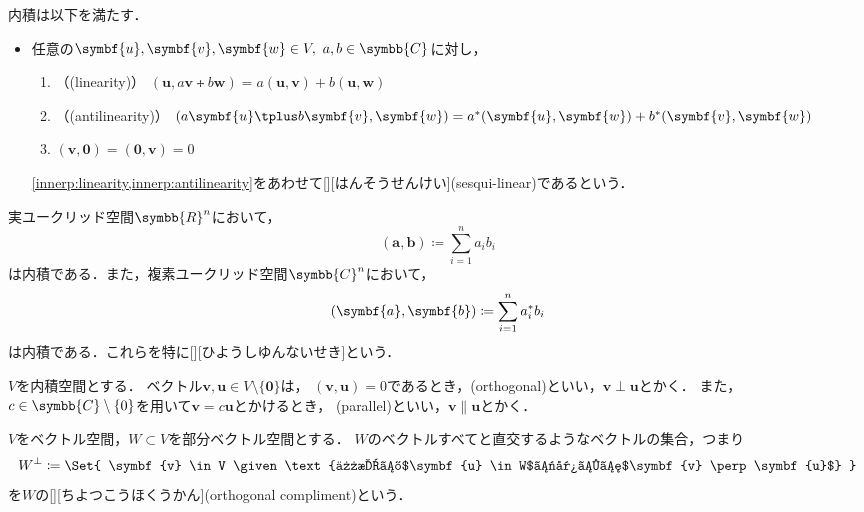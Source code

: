 \documentclass[../sotsu.tex]{subfiles}
\begin{document}
\begin{corollary}
    内積は以下を満たす．
    \begin{itemize}
        \item 任意の$\symbf{u}, \symbf{v}, \symbf{w} \in V, \  a, b \in \symbb{C}$に対し，
        \begin{enumerate}
            \item \label{innerp:linearity} （(linearity)） $(\symbf{u}, a\symbf{v} \tplus b\symbf{w}) = a (\symbf{u}, \symbf{v}) + b (\symbf{u}, \symbf{w})$
            \item \label{innerp:antilinearity} （(antilinearity)） $(a\symbf{u} \tplus b\symbf{v}, \symbf{w}) = \conj{a} (\symbf{u}, \symbf{w}) + \conj{b} (\symbf{v}, \symbf{w})$
            \item $(\symbf{v}, \symbf{0}) = (\symbf{0}, \symbf{v}) = 0$
        \end{enumerate}

        \cref{innerp:linearity,innerp:antilinearity}をあわせて[][はんそうせんけい](sesqui-linear)であるという．
    \end{itemize}
\end{corollary}


\begin{example}
    実ユークリッド空間$\symbb{R}^n$において，
    \begin{equation*}
        (\symbf{a}, \symbf{b}) \coloneq \sum_{i=1}^{n} a_i b_i
    \end{equation*}
    は内積である．また，複素ユークリッド空間$\symbb{C}^n$において，
    \begin{equation*}
        (\symbf{a}, \symbf{b}) \coloneq \sum_{i=1}^{n} \conj{a_i} b_i
    \end{equation*}
    は内積である．これらを特に[][ひようしゆんないせき]という．
\end{example}


\begin{definition}
    \label{dfn:orthogonal}
    \label{dfn:parallel}
    $V$を内積空間とする．
    ベクトル$\symbf{v}, \symbf{u} \in V \setminus \{\symbf{0}\}$は，
    $(\symbf{v}, \symbf{u}) = 0$であるとき，(orthogonal)といい，$\symbf{v} \perp \symbf{u}$とかく．
    また，$c \in \symbb{C} \setminus \{0\}$を用いて$\symbf{v} = c\symbf{u}$とかけるとき，
    (parallel)といい，$\symbf{v} \parallel \symbf{u}$とかく．
\end{definition}


\begin{definition}[直交補空間]
    $V$をベクトル空間，$W \subset V$を部分ベクトル空間とする．
    $W$のベクトルすべてと直交するようなベクトルの集合，つまり
    \begin{equation}
        W^\perp  \coloneq  \Set{  \symbf{v} \in V  
                                \given  \text{任意の$\symbf{u} \in W$に対して$\symbf{v} \perp \symbf{u}$}  }
    \end{equation}
    を$W$の[][ちよつこうほくうかん](orthogonal compliment)という．
\end{definition}
\end{document}
